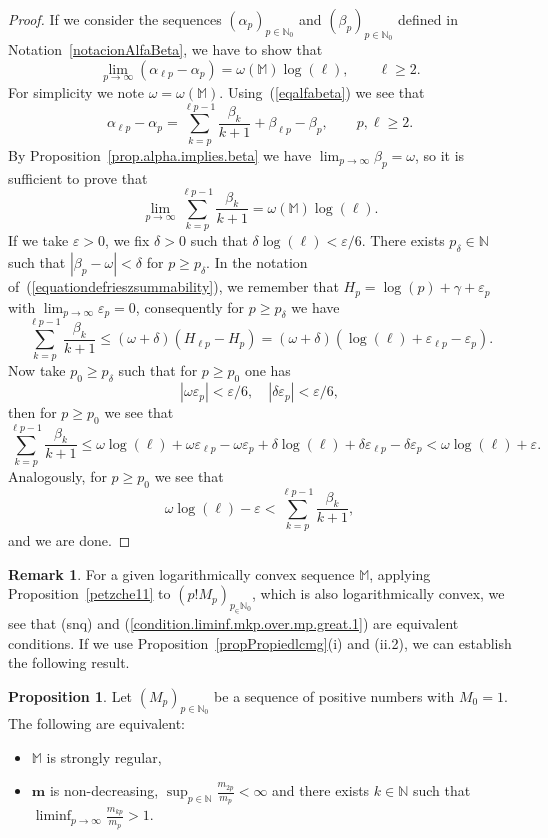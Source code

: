 \documentclass[11pt,a4paper]{article}
\theoremstyle{definition}
\newtheorem{pro}[theo]{Proposition}
\newtheorem{rema}[theo]{Remark}
\newenvironment{prop}{\smallskip\begin{pro}}{\end{pro}\smallskip}
\def\oo{\infty}
\def\ri{\rightarrow}
\def\a{\alpha}
\def\b{\beta}
\def\ep{\varepsilon}
\def\o{\omega}
\def\ga{\gamma}
\def\N{\mathbb{N}}
\def\M{\mathbb{M}}
\def\bm{\boldsymbol{m}}
\def\no{\nonumber}
\begin{document}
\begin{proof}
 If we consider the sequences $(\a_p)_{p\in\N_0}$ and $(\b_p)_{p\in\N_0}$ defined in Notation~\ref{notacionAlfaBeta}, we have to show that
 $$\lim_{p\ri\oo}( \a_{\ell p}-\a_p)=\o(\M)\log(\ell),\qquad \ell\geq2.$$
For simplicity we note $\o=\o(\M)$. Using~(\ref{eqalfabeta}) we see that
\begin{equation}
 \a_{\ell p}-\a_p=\sum^{\ell p-1}_{k=p}\frac{\b_k}{k+1}+\b_{\ell p}-\b_p, \qquad p,\ell\geq 2.\no
\end{equation}
By Proposition~\ref{prop.alpha.implies.beta} we have
$\lim_{p\ri\oo}\b_p=\o$,
so it is sufficient to prove that
$$\lim_{p\ri\oo} \sum^{\ell p-1}_{k=p}\frac{\b_k}{k+1} =\o(\M)\log(\ell).$$
If we take $\ep>0$, we fix $\delta>0$ such that $\delta\log(\ell)<\ep/6$. %
There exists $p_\delta\in\N$
such that
$|\b_p-\o|<\delta$ for $p\geq p_\delta$.
In the notation of~(\ref{equationdefrieszsummability}), we remember that $H_p=\log(p)+\ga+\ep_p$ with $\lim_{p\ri\oo} \ep_p=0$, consequently for $p\geq p_\delta$ we have
$$\sum^{\ell p-1}_{k=p}\frac{\b_k}{k+1} \leq (\o+\delta) (H_{\ell p}-H_p) = (\o+\delta) (\log(\ell) +\ep_{\ell p}-\ep_p).$$
Now take $p_0\geq p_\delta$ such that for $p\geq p_0$ one has
$$|\o\ep_p|<\ep/6,\quad |\delta\ep_p|<\ep/6,$$
then for $p\geq p_0$ we see that
$$\sum^{\ell p-1}_{k=p}\frac{\b_k}{k+1} \leq \o\log(\ell)+\o\ep_{\ell p} -\o\ep_p + \delta \log(\ell) +\delta\ep_{\ell p}-\delta\ep_p<\o\log(\ell)+\ep.$$
Analogously, for $p\geq p_0$ we see that
$$ \o\log(\ell)-\ep<\sum^{\ell p-1}_{k=p}\frac{\b_k}{k+1},$$
and we are done.
 \end{proof}

\begin{rema}
 For a given logarithmically convex sequence $\M$, applying Proposition~\ref{petzche11} to $(p!M_p)_{p_\in\N_0}$, which is also logarithmically
 convex, we see that (snq) and (\ref{condition.liminf.mkp.over.mp.great.1})
 are equivalent conditions. If we use
 Proposition~\ref{propPropiedlcmg}(i) and (ii.2),
 we can establish the following result.
\end{rema}

\begin{prop}\label{alt.def.SRS} Let  $(M_p)_{p\in\N_0}$ be a sequence of positive numbers with $M_0=1$. The following are equivalent:
\begin{itemize}
\item[(i)] $\M$ is strongly regular,
\item[(ii)] $\bm$ is non-decreasing, $\displaystyle\sup_{p\in\N} \frac{m_{2p}}{m_{p}}<\oo$ and there exists $k\in\N$ such that $\displaystyle\liminf_{p\ri\oo} \frac{m_{kp}}{m_p}>1$.
\end{itemize}
\end{prop}
\end{document}
